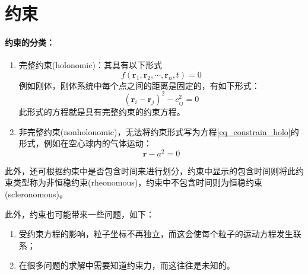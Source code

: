 \section{约束}
\paragraph*{约束的分类：}
\begin{enumerate}
	\item 完整约束(holonomic)：其具有以下形式
		\begin{equation}
			f(\bm{r}_1, \bm{r}_2,\cdots, \bm{r}_n, t) = 0	\label{eq_constrain_holo}
		\end{equation} 
		例如刚体，刚体系统中每个点之间的距离是固定的，有如下形式：
		\begin{equation*}
			(\bm{r}_i - \bm{r}_j)^2 - c_{ij}^2 = 0
		\end{equation*} 
		此形式的方程就是具有完整约束的约束方程。	
	\item 非完整约束(nonholonomic)，无法将约束形式写为方程\eqref{eq_constrain_holo}的形式，例如在空心球内的气体运动：
		\begin{equation*}
			\bm{r} - a^2 = 0
		\end{equation*} 
\end{enumerate}
此外，还可根据约束中是否包含时间来进行划分，约束中显示的包含时间则将此约束类型称为非恒稳约束(rheonomous)，约束中不包含时间则为恒稳约束(scleronomous)。

此外，约束也可能带来一些问题，如下：
\begin{enumerate}
	\item 受约束方程的影响，粒子坐标不再独立，而这会使每个粒子的运动方程发生联系；
	\item 在很多问题的求解中需要知道约束力，而这往往是未知的。
\end{enumerate}

